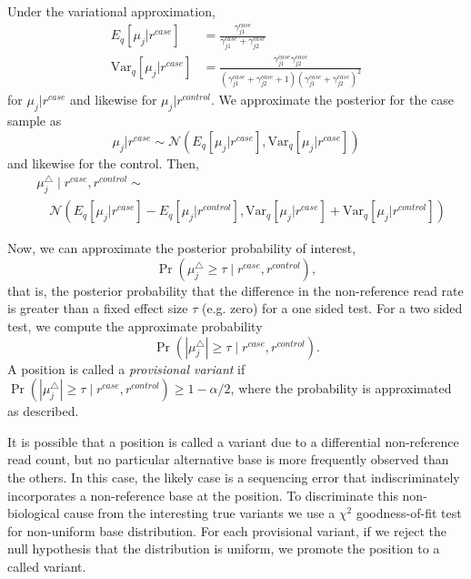 \documentclass{bmcart}
\begin{document}
Under the variational approximation,
\begin{align}
  E_q[\mu_j|r^{case}] &= \frac{\gamma_{j1}^{case}}{\gamma_{j1}^{case} + \gamma_{j2}^{case}}
  \\
  \text{Var}_q[\mu_j|r^{case}] &= \frac{\gamma_{j1}^{case} \gamma_{j2}^{case}}{(\gamma_{j1}^{case} + \gamma_{j2}^{case} + 1)(\gamma_{j1}^{case} + \gamma_{j2}^{case})^2}
\end{align}
for $\mu_j|r^{case}$ and likewise for $\mu_j|r^{control}$.
We approximate the posterior for the case sample as
\begin{equation}
  \mu_j | r^{case} \sim \mathcal{N}(E_q[\mu_j|r^{case}], \text{Var}_q[\mu_j|r^{case}])
\end{equation}
and likewise for the control.
Then,
\begin{equation}
\begin{split}
  &\mu_j^{\triangle} \mid r^{case}, r^{control} \sim \\
  &\quad \mathcal{N}(E_q[\mu_j|r^{case}] - E_q[\mu_j|r^{control}], \text{Var}_q[\mu_j|r^{case}] + \text{Var}_q[\mu_j|r^{control}])
\end{split}
\end{equation}

Now, we can approximate the posterior probability of interest,
\begin{equation}
  \Pr( \mu_j^{\triangle} \geq \tau \mid r^{case}, r^{control} ),
\end{equation}
that is, the posterior probability that the difference in the non-reference read rate is greater than a fixed effect size $\tau$ (e.g. zero) for a one sided test.
For a two sided test, we compute the approximate probability
\begin{equation}
  \Pr( | \mu_j^{\triangle} | \geq \tau \mid r^{case}, r^{control}).
\end{equation}
A position is called a \textit{provisional variant} if $\Pr( | \mu_j^{\triangle} | \geq \tau \mid r^{case}, r^{control}) \geq 1-\alpha/2$, where the probability is approximated as described.

It is possible that a position is called a variant due to a differential non-reference read count, but no particular alternative base is more frequently observed than the others.
In this case, the likely case is a sequencing error that indiscriminately incorporates a non-reference base at the position.
To discriminate this non-biological cause from the interesting true variants we use a $\chi^2$ goodness-of-fit test for non-uniform base distribution\cite{efron2010large, he2015rvd2}.
For each provisional variant, if we reject the null hypothesis that the distribution is uniform, we promote the position to a called variant.
\end{document}
